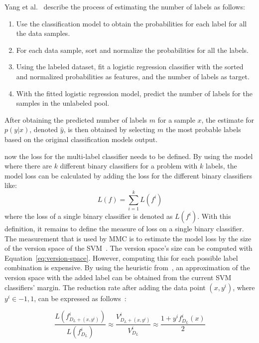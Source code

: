 Yang et al\@.~\cite{yang2009effective} describe the process of estimating the number of labels as follows:
\begin{enumerate}
    \item Use the classification model to obtain the probabilities for each label for all the data samples.
    \item For each data sample, sort and normalize the probabilities for all the labels.
    \item Using the labeled dataset, fit a logistic regression classifier with the sorted and normalized probabilities as features, and the number of labels as target.
    \item With the fitted logistic regression model, predict the number of labels for the samples in the unlabeled pool.
\end{enumerate}

After obtaining the predicted number of labels $m$ for a sample $x$, the estimate for $p(y|x)$, denoted $\hat{y}$, is then obtained by selecting $m$ the most probable labels based on the original classification models output.

now the loss for the multi-label classifier needs to be defined.
By using the model where there are $k$ different binary classifiers for a problem with $k$ labels, the model loss can be calculated by adding the loss for the different binary classifiers like:
\begin{equation}
    L(f) = \sum_{i = 1}^k L(f^i)
\end{equation}
where the loss of a single binary classifier is denoted as $L(f^i)$.
With this definition, it remains to define the measure of loss on a single binary classifier.
The measurement that is used by MMC is to estimate the model loss by the size of the version space of the SVM~\cite{tong2001support, yang2009effective}.
The version space's size can be computed with Equation~\ref{eq:version-space}.
However, computing this for each possible label combination is expensive.
By using the heuristic from~\cite{tong2001active}, an approximation of the version space with the added label can be obtained from the current SVM classifiers' margin.
The reduction rate after adding the data point $(x, y^i)$, where $y^i \in {-1, 1}$, can be expressed as follows~\cite{yang2009effective, tong2001active}:

\begin{equation}\label{eq:reduction-rate}
    \frac{L(f^i_{D_L+(x, y^i)})}{L(f^i_{D_L})} \approx \frac{V^i_{D_L + (x, y^i)}}{V^i_{D_L}} \approx \frac{1 + y^i f^i_{D_L}(x)}{2}
\end{equation}

